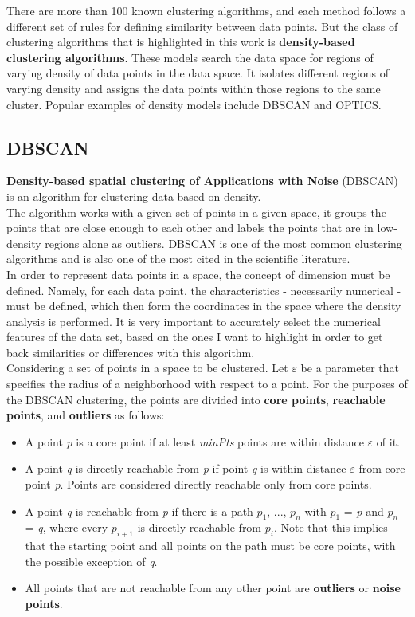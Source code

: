     There are more than 100 known clustering algorithms, and each method follows a different set of rules for defining similarity between data points. But the class of clustering algorithms that is highlighted in this work is \textbf{density-based clustering algorithms}. These models search the data space for regions of varying density of data points in the data space. It isolates different regions of varying density and assigns the data points within those regions to the same cluster. Popular examples of density models include DBSCAN and OPTICS.
    
    
    \subsection{DBSCAN}
    \textbf{Density-based spatial clustering of Applications with Noise} (DBSCAN) is an algorithm for clustering data based on density.
    \\
    The algorithm works with a given set of points in a given space, it groups the points that are close enough to each other and labels the points that are in low-density regions alone as outliers. DBSCAN is one of the most common clustering algorithms and is also one of the most cited in the scientific literature.
    \\
    In order to represent data points in a space, the concept of dimension must be defined. Namely, for each data point, the characteristics - necessarily numerical - must be defined, which then form the coordinates in the space where the density analysis is performed. It is very important to accurately select the numerical features of the data set, based on the ones I want to highlight in order to get back similarities or differences with this algorithm.
    \\
    Considering a set of points in a space to be clustered. Let $\varepsilon$ be a parameter that specifies the radius of a neighborhood with respect to a point.
    For the purposes of the DBSCAN clustering, the points are divided into \textbf{core points}, \textbf{reachable points}, and \textbf{outliers} as follows:
        
    \begin{itemize}
    \item A point \textit{p} is a core point if at least \textit{minPts} points are within distance $\varepsilon$ of it.
    \item A point \textit{q} is directly reachable from \textit{p} if point \textit{q} is within distance $\varepsilon$ from core point \textit{p}. Points are considered directly reachable only from core points.
    \item A point \textit{q} is reachable from \textit{p} if there is a path \textit{$p_1$}, ..., \textit{$p_n$} with \textit{$p_1$} = \textit{p} and \textit{$p_n$} = \textit{q}, where every \textit{$p_{i+1}$} is directly reachable from \textit{$p_i$}. Note that this implies that the starting point and all points on the path must be core points, with the possible exception of \textit{q}.
    \item All points that are not reachable from any other point are \textbf{outliers} or \textbf{noise points}.
    \end{itemize}
    
